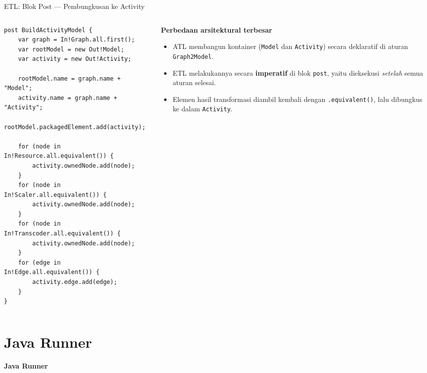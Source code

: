 \documentclass[aspectratio=169, table]{beamer}
\begin{document}
\begin{frame}[fragile]{ETL: Blok Post --- Pembungkusan ke Activity}
\vspace{10pt}
\begin{columns}[T]
    \begin{column}{0.5\textwidth}
\begin{lstlisting}[language=etl, basicstyle=\ttfamily\tiny]
post BuildActivityModel {
    var graph = In!Graph.all.first();
    var rootModel = new Out!Model;
    var activity = new Out!Activity;

    rootModel.name = graph.name + "Model";
    activity.name = graph.name + "Activity";
    rootModel.packagedElement.add(activity);

    for (node in In!Resource.all.equivalent()) {
        activity.ownedNode.add(node);
    }
    for (node in In!Scaler.all.equivalent()) {
        activity.ownedNode.add(node);
    }
    for (node in In!Transcoder.all.equivalent()) {
        activity.ownedNode.add(node);
    }
    for (edge in In!Edge.all.equivalent()) {
        activity.edge.add(edge);
    }
}
\end{lstlisting}
    \end{column}

    \begin{column}{0.5\textwidth}
    \small
    \textbf{Perbedaan arsitektural terbesar}

    \begin{itemize}
        \item ATL membangun kontainer
        (\texttt{Model} dan \texttt{Activity})
        secara deklaratif di aturan
        \texttt{Graph2Model}.
        
        \item ETL melakukannya secara
        \textbf{imperatif} di blok
        \texttt{post}, yaitu dieksekusi
        \textit{setelah} semua aturan selesai.
        
        \item Elemen hasil transformasi diambil
        kembali dengan \texttt{.equivalent()},
        lalu dibungkus ke dalam
        \texttt{Activity}.
    \end{itemize}
    \end{column}
\end{columns}
\end{frame}

\section{Java Runner}
\begin{frame}{\hfill}
	\centering
	\Huge{\textbf{Java Runner}}
\end{frame}
\end{document}
